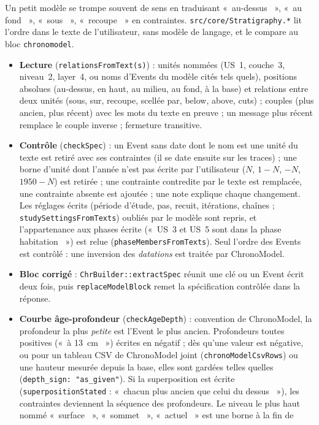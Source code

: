 \documentclass[11pt,a4paper]{article}
\providecommand{\og}{«~}\providecommand{\fg}{\unskip~»}
\newcommand{\code}[1]{\texttt{\small #1}}
\begin{document}
Un petit modèle se trompe souvent de sens en traduisant \og au-dessus \fg, \og au fond \fg, \og sous \fg,
\og recoupe \fg{} en contraintes. \code{src/core/Stratigraphy.*} lit l'ordre dans le texte de l'utilisateur, sans
modèle de langage, et le compare au bloc \code{chronomodel}.
\begin{itemize}[leftmargin=*]
\item \textbf{Lecture} (\code{relationsFromText(s)}) : unités nommées (US~1, couche~3, niveau~2, layer~4, ou noms
  d'Events du modèle cités tels quels), positions absolues (au-dessus, en haut, au milieu, au fond, à la base) et
  relations entre deux unités (sous, sur, recoupe, scellée par, below, above, cuts) ; couples (plus ancien, plus
  récent) avec les mots du texte en preuve ; un message plus récent remplace le couple inverse ; fermeture transitive.
\item \textbf{Contrôle} (\code{checkSpec}) : un Event sans date dont le nom est une unité du texte est retiré avec ses
  contraintes (il se date ensuite sur les traces) ; une borne d'unité dont l'année n'est pas écrite par l'utilisateur
  ($N$, $1-N$, $-N$, $1950-N$) est retirée ; une contrainte contredite par le texte est remplacée, une contrainte
  absente est ajoutée ; une note explique chaque changement. Les réglages écrits (période d'étude, pas, recuit,
  itérations, chaînes ; \code{studySettingsFromTexts}) oubliés par le modèle sont repris, et l'appartenance aux phases
  écrite (\og US~3 et US~5 sont dans la phase habitation \fg) est relue (\code{phaseMembersFromTexts}). Seul l'ordre
  des Events est contrôlé : une inversion des \emph{datations} est traitée par ChronoModel.
\item \textbf{Bloc corrigé} : \code{ChrBuilder::extractSpec} réunit une clé ou un Event écrit deux fois, puis
  \code{replaceModelBlock} remet la spécification contrôlée dans la réponse.
\item \textbf{Courbe âge-profondeur} (\code{checkAgeDepth}) : convention de ChronoModel, la profondeur la plus
  \emph{petite} est l'Event le plus ancien. Profondeurs toutes positives (\og à 13~cm \fg) écrites en négatif ; dès qu'une
  valeur est négative, ou pour un tableau CSV de ChronoModel joint (\code{chronoModelCsvRows}) ou une hauteur mesurée
  depuis la base, elles sont gardées telles quelles (\code{depth\_sign: "as\_given"}). Si la superposition est écrite
  (\code{superpositionStated} : \og chacun plus ancien que celui du dessus \fg), les contraintes deviennent la séquence
  des profondeurs. Le niveau le plus haut nommé \og surface \fg, \og sommet \fg, \og actuel \fg{} est une borne à la fin de

\end{itemize}
\end{document}
